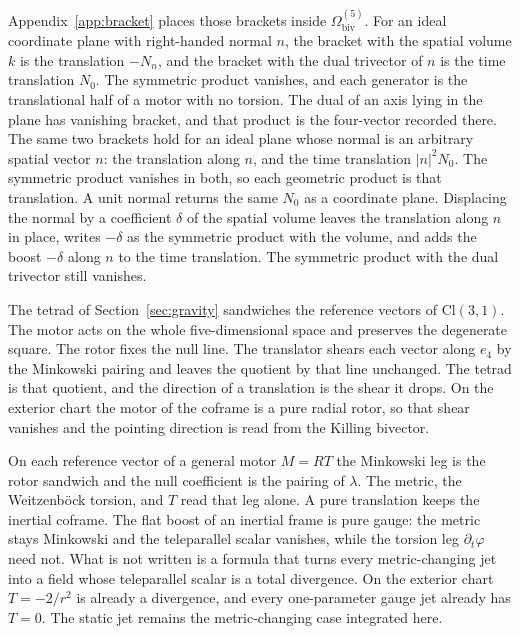 \documentclass[a4paper]{article}
\begin{document}
Appendix~\ref{app:bracket} places those brackets inside \(\Omega_{\mathrm{biv}}^{(5)}\). For an ideal coordinate plane with right-handed normal \(n\), the bracket with the spatial volume \(k\) is the translation \(-N_{n}\), and the bracket with the dual trivector of \(n\) is the time translation \(N_{0}\). The symmetric product vanishes, and each generator is the translational half of a motor with no torsion. The dual of an axis lying in the plane has vanishing bracket, and that product is the four-vector recorded there. The same two brackets hold for an ideal plane whose normal is an arbitrary spatial vector \(n\): the translation along \(n\), and the time translation \(|n|^{2}N_{0}\). The symmetric product vanishes in both, so each geometric product is that translation. A unit normal returns the same \(N_{0}\) as a coordinate plane. Displacing the normal by a coefficient \(\delta\) of the spatial volume leaves the translation along \(n\) in place, writes \(-\delta\) as the symmetric product with the volume, and adds the boost \(-\delta\) along \(n\) to the time translation. The symmetric product with the dual trivector still vanishes.

The tetrad of Section~\ref{sec:gravity} sandwiches the reference vectors of \(\mathrm{Cl}(3,1)\). The motor acts on the whole five-dimensional space and preserves the degenerate square. The rotor fixes the null line. The translator shears each vector along \(e_{4}\) by the Minkowski pairing and leaves the quotient by that line unchanged. The tetrad is that quotient, and the direction of a translation is the shear it drops. On the exterior chart the motor of the coframe is a pure radial rotor, so that shear vanishes and the pointing direction is read from the Killing bivector.

On each reference vector of a general motor \(M=RT\) the Minkowski leg is the rotor sandwich and the null coefficient is the pairing of \(\lambda\). The metric, the Weitzenb\"{o}ck torsion, and \(T\) read that leg alone. A pure translation keeps the inertial coframe. The flat boost of an inertial frame is pure gauge: the metric stays Minkowski and the teleparallel scalar vanishes, while the torsion leg \(\partial_{t}\varphi\) need not. What is not written is a formula that turns every metric-changing jet into a field whose teleparallel scalar is a total divergence. On the exterior chart \(T=-2/r^{2}\) is already a divergence, and every one-parameter gauge jet already has \(T=0\). The static jet remains the metric-changing case integrated here.
\end{document}

